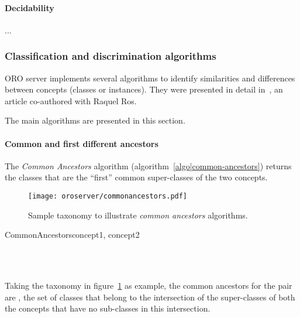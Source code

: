 \paragraph{Decidability}

...

\subsubsection{Classification and discrimination algorithms}
\label{sect|discrimination}

ORO server implements several algorithms to identify similarities and
differences between concepts (classes or instances). They were presented in
detail in~\cite{Ros2010b}, an article co-authored with Raquel Ros.

The main algorithms are presented in this section.

\paragraph{Common and first different ancestors} The \emph{Common Ancestors}
algorithm (algorithm~\ref{algo|common-ancestors}) returns the classes that
are the ``first'' common super-classes of the two concepts.

\begin{figure}
    \centering
    \texttt{[image: oroserver/commonancestors.pdf]}
    \caption{Sample taxonomy to illustrate \emph{common ancestors} algorithms.}
    \label{fig|common-ancestors}
\end{figure}

\small
\begin{pseudocode}[ruled]{CommonAncestors}{concept1, concept2}
\label{algo|common-ancestors}

\BEGIN
{} \GETS {} \cap {} \\
\\
\END

\end{pseudocode}
\normalsize

Taking the taxonomy in figure~\ref{fig|common-ancestors} as example, the common
ancestors for the pair  are
, \ie the set of classes that belong to
the intersection of the super-classes of both the concepts that have no
sub-classes in this intersection.

